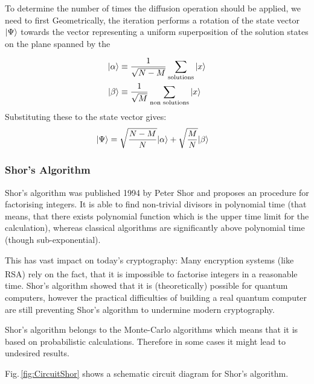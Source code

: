 \documentclass[bibliography=totocnumbered]{article}
\newcommand{\citeS}[1]{\textsuperscript{\cite{#1}}}
\theoremstyle{NoticeStyle}
\begin{document}
To determine the number of times the diffusion operation should be applied, we need to first
Geometrically, the iteration performs a rotation of the state vector ${\left\vert{\Psi}\right\rangle}$ towards the vector representing a uniform superposition of the solution states on the plane spanned by the 

\begin{align}
	{\left\vert{\alpha}\right\rangle} &\equiv \frac{1}{\sqrt{N-M}} \sum_\textrm{solutions} {\left\vert{x}\right\rangle}\\
	{\left\vert{\beta}\right\rangle} &\equiv \frac{1}{\sqrt{M}} \sum_\textrm{non solutions} {\left\vert{x}\right\rangle}
\end{align}
Substituting these to the state vector gives:
\begin{align}
	{\left\vert{\Psi}\right\rangle} &= \sqrt{\frac{N-M}{N}}{\left\vert{\alpha}\right\rangle} +\sqrt{\frac{M}{N}}{\left\vert{\beta}\right\rangle}
\end{align}

\subsubsection{Shor's Algorithm}

Shor's algorithm was published 1994 by Peter Shor and proposes an procedure for factorising integers. It is able to find non-trivial divisors in polynomial time (that means, that there exists polynomial function which is the upper time limit for the calculation), whereas classical algorithms are significantly above polynomial time (though sub-exponential).

This has vast impact on today's cryptography: Many encryption systems (like RSA)\citeS{RSAcrypto} rely on the fact, that it is impossible to factorise integers in a reasonable time. Shor's algorithm showed that it is (theoretically) possible for quantum computers, however the practical difficulties of building a real quantum computer are still preventing Shor's algorithm to undermine modern cryptography.

Shor's algorithm belongs to the Monte-Carlo algorithms which means that it is based on probabilistic calculations. Therefore in some cases it might lead to undesired results.



Fig.\,\ref{fig:CircuitShor} shows a schematic circuit diagram for Shor's algorithm.
\end{document}
